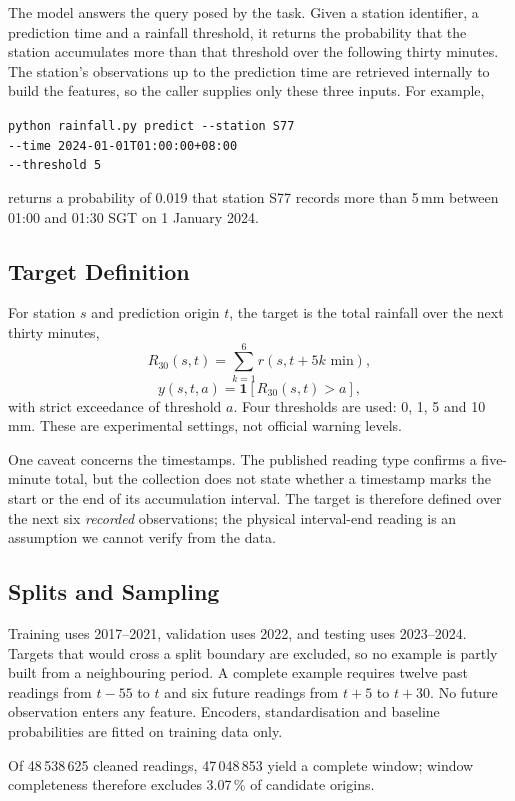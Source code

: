 \documentclass[10pt,a4paper,twocolumn,twoside]{rho-class/rho}
\begin{document}
The model answers the query posed by the task. Given a station identifier, a prediction time and a rainfall threshold, it returns the probability that the station accumulates more than that threshold over the following thirty minutes. The station's observations up to the prediction time are retrieved internally to build the features, so the caller supplies only these three inputs. For example,
\begin{center}\footnotesize
\texttt{python rainfall.py predict -{}-station S77}\\
\texttt{-{}-time 2024-01-01T01:00:00+08:00}\\
\texttt{-{}-threshold 5}
\end{center}
returns a probability of 0.019 that station S77 records more than 5\,mm between 01:00 and 01:30 SGT on 1 January 2024.

\subsection{Target Definition}
For station $s$ and prediction origin $t$, the target is the total rainfall over the next thirty minutes,
\[R_{30}(s,t)=\sum_{k=1}^{6}r(s,t+5k\text{ min}),\]
\[y(s,t,a)=\mathbf{1}[R_{30}(s,t)>a],\]
with strict exceedance of threshold $a$. Four thresholds are used: 0, 1, 5 and 10\,mm. These are experimental settings, not official warning levels.

One caveat concerns the timestamps. The published reading type confirms a five-minute total, but the collection does not state whether a timestamp marks the start or the end of its accumulation interval. The target is therefore defined over the next six \emph{recorded} observations; the physical interval-end reading is an assumption we cannot verify from the data.

\subsection{Splits and Sampling}
Training uses 2017--2021, validation uses 2022, and testing uses 2023--2024. Targets that would cross a split boundary are excluded, so no example is partly built from a neighbouring period. A complete example requires twelve past readings from $t-55$ to $t$ and six future readings from $t+5$ to $t+30$. No future observation enters any feature. Encoders, standardisation and baseline probabilities are fitted on training data only.

Of 48\,538\,625 cleaned readings, 47\,048\,853 yield a complete window; window completeness therefore excludes 3.07\,\% of candidate origins.
\end{document}
